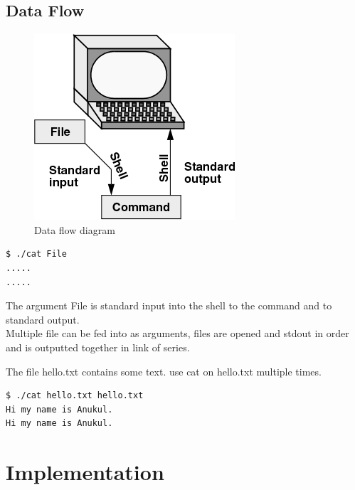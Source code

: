 \documentclass[12pt,a4paper,oneside]{report}
\begin{document}
\section*{Data Flow}
\begin{figure}[hbt!]
\centering
        \includegraphics[totalheight=4cm]{../scrot/fig_stdin}
    \caption{Data flow diagram}
    \label{fig:verticalcell}
\end{figure}

\begin{lstlisting}[language=bash]
$ ./cat File
.....
.....
\end{lstlisting}
The argument File is standard input into the shell to the command and to standard output.\\
Multiple file can be fed into as arguments, files are opened and stdout in order and is outputted together in link of series.

The file hello.txt contains some text. use cat on hello.txt multiple times.
\begin{lstlisting}[language=bash]
$ ./cat hello.txt hello.txt
Hi my name is Anukul.
Hi my name is Anukul.
\end{lstlisting}
\newpage


\chapter*{Implementation}
\end{document}
